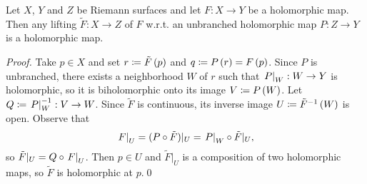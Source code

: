 \documentclass[../Moduli_Spaces_of_Riemann_Surfaces.tex]{subfiles}
\begin{document}
    \begin{proposition}
        Let $X$, $Y$ and $Z$ be Riemann surfaces and let $F:X\to Y$ be a holomorphic map. Then any lifting $\tilde{F}:X\to Z$ of $F$ w.r.t. an unbranched holomorphic map $P:Z\to Y$ is a holomorphic map.
    \end{proposition}
    \vspace{-0.1in}
    \begin{proof}
        Take $p\in X$ and set $r\coloneqq\tilde{F}\left(p\right)$ and $q\coloneqq P\left(r\right)=F\left(p\right)$. Since $P$ is unbranched, there exists a neighborhood $W$ of $r$ such that $\left.P\right|_W:W\to Y$ is holomorphic, so it is biholomorphic onto its image $V\coloneqq P\left(W\right)$. Let $Q\coloneqq\left.P\right|_W^{-1}:V\to W $. Since $\tilde{F}$ is continuous, its inverse image $U\coloneqq\tilde{F}^{-1}\left(W\right)$ is open. Observe that
        \begin{equation*}
            \left.F\right|_U=(P\circ\tilde{F})|_U=\left.P\right|_W\circ\tilde{F}|_U,
        \end{equation*}
        so $\tilde{F}|_U=Q\circ\left.F\right|_U$. Then $p\in U$ and $\tilde{F}|_U$ is a composition of two holomorphic maps, so $\tilde{F}$ is holomorphic at $p$.\qed
    \end{proof}
\end{document}
